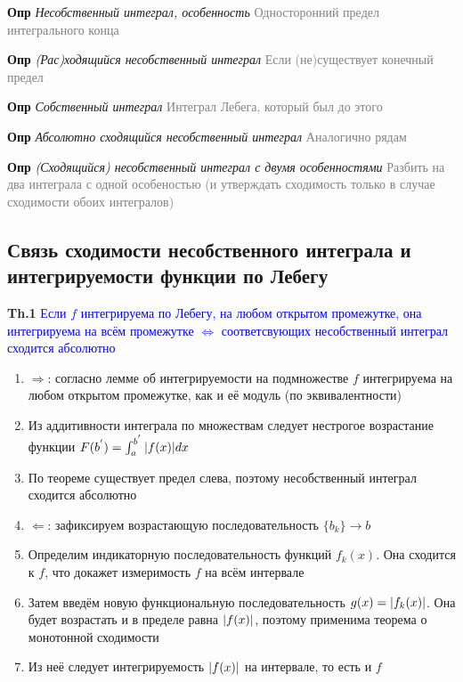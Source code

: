 \documentclass[a4paper, 14pt]{article}
\begin{document}
    \textbf{Опр} \textit{Несобственный интеграл, особенность} \textcolor{gray}{Односторонний предел интегрального конца}
    
    \textbf{Опр} \textit{(Рас)ходящийся несобственный интеграл} \textcolor{gray}{Если (не)существует конечный предел}
    
    \textbf{Опр} \textit{Собственный интеграл} \textcolor{gray}{Интеграл Лебега, который был до этого}
    
    \textbf{Опр} \textit{Абсолютно сходящийся несобственный интеграл} \textcolor{gray}{Аналогично рядам}
    
    \textbf{Опр} \textit{(Сходящийся) несобственный интеграл с двумя особенностями} \textcolor{gray}{Разбить на два
    интеграла с одной особеностью (и утверждать сходимость только в случае сходимости обоих интегралов)}
    
    \subsection{Связь сходимости несобственного интеграла и интегрируемости функции по Лебегу}
    
    \textbf{Th.1} \textcolor{blue}{Если $f$ интегрируема по Лебегу, на любом открытом промежутке, она
    интегрируема на всём промежутке $\Leftrightarrow$ соответсвующих несобственный интеграл сходится абсолютно}
    
    \begin{enumerate}
        \item $\Rightarrow$: согласно лемме об интегрируемости на подмножестве $f$ интегрируема на любом открытом
        промежутке, как и её модуль (по эквивалентности)
        \item Из аддитивности интеграла по множествам следует нестрогое возрастание функции $F(b^{'}) = \int_a^{b^{'}} \abs{f(x
            )} dx $
        \item По теореме существует предел слева, поэтому несобственный интеграл сходится абсолютно
        \item $\Leftarrow$: зафиксируем возрастающую последовательность $\{b_k\} \rightarrow b$
        \item Определим индикаторную последовательность функций $f_k(x)$.
        Она сходится к $f$, что докажет измеримость $f$ на всём интервале
        \item Затем введём новую функциональную последовательность $g(x) = \abs{f_k(x)}$.
        Она будет возрастать и в пределе равна $\abs{f(x)}$, поэтому применима теорема о монотонной сходимости
        \item Из неё следует интегрируемость $\abs{f(x)}$ на интервале, то есть и $f$
    \end{enumerate}
    
\end{document}
